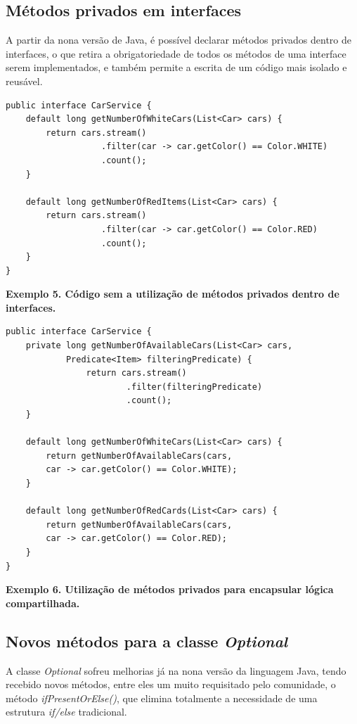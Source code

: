 \documentclass[12pt]{article}
\begin{document}
\subsection{Métodos privados em interfaces}

\cite{quickGuide} A partir da nona versão de Java, é possível declarar métodos privados dentro de interfaces, o que retira a obrigatoriedade de todos os métodos de uma interface serem implementados, e também permite a escrita de um código mais isolado e reusável.

\begin{verbatim}
public interface CarService {
    default long getNumberOfWhiteCars(List<Car> cars) {
        return cars.stream()
                   .filter(car -> car.getColor() == Color.WHITE)
                   .count();
    }
 
    default long getNumberOfRedItems(List<Car> cars) {
        return cars.stream()
                   .filter(car -> car.getColor() == Color.RED)
                   .count();
    }
}
\end{verbatim}

\centerline{\textbf{Exemplo 5. Código sem a utilização de métodos privados dentro de interfaces.}}

\begin{verbatim}
public interface CarService {
    private long getNumberOfAvailableCars(List<Car> cars,
            Predicate<Item> filteringPredicate) {
                return cars.stream()
                        .filter(filteringPredicate)
                        .count();
    }
 
    default long getNumberOfWhiteCars(List<Car> cars) {
        return getNumberOfAvailableCars(cars, 
        car -> car.getColor() == Color.WHITE); 
    }
 
    default long getNumberOfRedCards(List<Car> cars) {
        return getNumberOfAvailableCars(cars,
        car -> car.getColor() == Color.RED);
    }
}
\end{verbatim}
\centerline{\textbf{Exemplo 6. Utilização de métodos privados para encapsular lógica compartilhada.}}

\subsection{Novos métodos para a classe \textit{Optional}}

A classe \textit{Optional} sofreu melhorias já na nona versão da linguagem Java, tendo recebido novos métodos, entre eles um muito requisitado pelo comunidade, o método \textit{ifPresentOrElse()}, que elimina totalmente a necessidade de uma estrutura \textit{if/else} tradicional.
\end{document}
